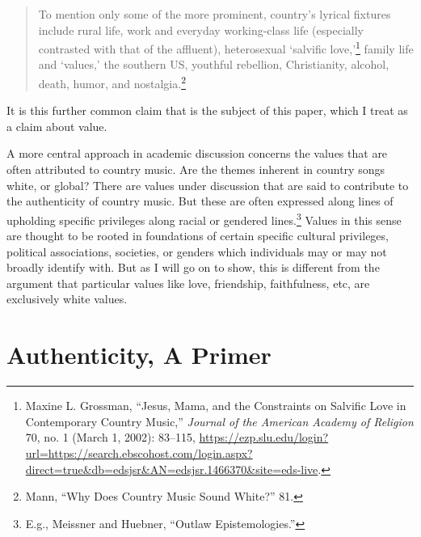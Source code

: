 \documentclass[
  12pt,
]{book}
\theoremstyle{definition}
\theoremstyle{definition}
\theoremstyle{definition}
\theoremstyle{definition}
\theoremstyle{remark}
\begin{document}
\begin{quote}
To mention only some of the more prominent, country's lyrical fixtures include rural life, work and everyday working-class life (especially contrasted with that of the affluent), heterosexual `salvific love,'\footnote{Maxine L. Grossman, {``Jesus, {Mama}, and the {Constraints} on {Salvific Love} in {Contemporary Country Music},''} \emph{Journal of the American Academy of Religion} 70, no. 1 (March 1, 2002): 83--115, \url{https://ezp.slu.edu/login?url=https://search.ebscohost.com/login.aspx?direct=true&db=edsjsr&AN=edsjsr.1466370&site=eds-live}.} family life and `values,' the southern US, youthful rebellion, Christianity, alcohol, death, humor, and nostalgia.\footnote{Mann, {``Why Does Country Music Sound White?''} 81.}
\end{quote}

It is this further common claim that is the subject of this paper, which I treat as a claim about value.

A more central approach in academic discussion concerns the values that are often attributed to country music. Are the themes inherent in country songs white, or global? There are values under discussion that are said to contribute to the authenticity of country music. But these are often expressed along lines of upholding specific privileges along racial or gendered lines.\footnote{E.g., Meissner and Huebner, {``Outlaw Epistemologies.''}} Values in this sense are thought to be rooted in foundations of certain specific cultural privileges, political associations, societies, or genders which individuals may or may not broadly identify with. But as I will go on to show, this is different from the argument that particular values like love, friendship, faithfulness, etc, are exclusively white values.

\section{Authenticity, A Primer}\label{authenticity-a-primer}
\end{document}
